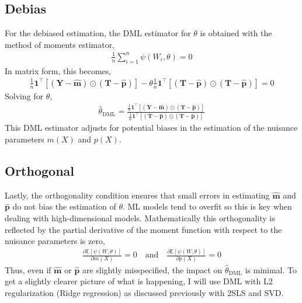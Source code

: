 \subsection{Debias}
For the debiased estimation, the DML estimator for \(\theta\) is obtained with the method of moments estimator,
\begin{align}
\frac{1}{n} \sum_{i=1}^n \psi(W_i, \theta) = 0
\end{align}
In matrix form, this becomes,
\begin{align}
\frac{1}{n} \mathbf{1}^\top \left[ (\mathbf{Y} - \hat{\mathbf{m}}) \odot (\mathbf{T} - \hat{\mathbf{p}}) \right] - \theta \frac{1}{n} \mathbf{1}^\top \left[ (\mathbf{T} - \hat{\mathbf{p}}) \odot (\mathbf{T} - \hat{\mathbf{p}}) \right] = 0
\end{align}
Solving for \(\theta\),
\begin{align}
\hat{\theta}_{\text{DML}} = \frac{\frac{1}{n} \mathbf{1}^\top \left[ (\mathbf{Y} - \hat{\mathbf{m}}) \odot (\mathbf{T} - \hat{\mathbf{p}}) \right]}{\frac{1}{n} \mathbf{1}^\top \left[ (\mathbf{T} - \hat{\mathbf{p}}) \odot (\mathbf{T} - \hat{\mathbf{p}}) \right]}
\end{align}
This DML estimator adjusts for potential biases in the estimation of the nuisance parameters \(m(X)\) and \(p(X)\).
\subsection{Orthogonal}
Lastly, the orthogonality condition ensures that small errors in estimating \(\hat{\mathbf{m}}\) and \(\hat{\mathbf{p}}\) do not bias the estimation of \(\theta\). ML models tend to overfit so this is key when dealing with high-dimensional models. Mathematically this orthogonality is reflected by the partial derivative of the moment function with respect to the nuisance parameters is zero,
\begin{align}
\frac{\partial \mathbb{E}[\psi(W, \theta)]}{\partial m(X)} = 0 \quad \text{and} \quad \frac{\partial \mathbb{E}[\psi(W, \theta)]}{\partial p(X)} = 0
\end{align}
Thus, even if \(\hat{\mathbf{m}}\) or \(\hat{\mathbf{p}}\) are slightly misspecified, the impact on \(\hat{\theta}_{\text{DML}}\) is minimal. To get a slightly clearer picture of what is happening, I will use DML with L2 regularization (Ridge regression) as discussed previously with 2SLS and SVD.